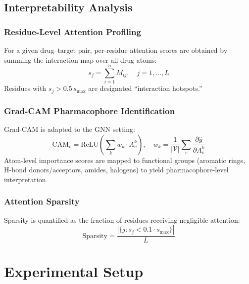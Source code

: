 \documentclass[fleqn,10pt]{wlscirep}
\begin{document}
\subsection{Interpretability Analysis}

\subsubsection{Residue-Level Attention Profiling}

For a given drug--target pair, per-residue attention scores are obtained by
summing the interaction map over all drug atoms:
\begin{equation}
s_j = \sum_{i=1}^{n} M_{ij},\quad j=1,\ldots,L
\end{equation}
Residues with $s_j > 0.5\,s_\text{max}$ are designated ``interaction
hotspots.''

\subsubsection{Grad-CAM Pharmacophore Identification}

Grad-CAM\cite{selvaraju2017grad} is adapted to the GNN setting:
\begin{equation}
\mathrm{CAM}_v = \mathrm{ReLU}\!\left(\sum_k w_k\cdot A_v^k\right),\quad
w_k = \frac{1}{|\mathcal{V}|}\sum_v\frac{\partial\hat{y}}{\partial A_v^k}
\end{equation}
Atom-level importance scores are mapped to functional groups (aromatic rings,
H-bond donors/acceptors, amides, halogens) to yield pharmacophore-level
interpretation.

\subsubsection{Attention Sparsity}

Sparsity is quantified as the fraction of residues receiving negligible
attention:
\begin{equation}
\mathrm{Sparsity} = \frac{|\{j : s_j < 0.1\cdot s_\mathrm{max}\}|}{L}
\end{equation}

\section{Experimental Setup}
\label{sec:experiments}
\end{document}
